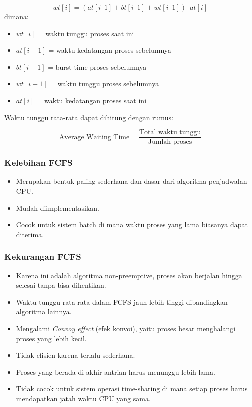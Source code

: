 \documentclass[12pt]{article}
\begin{document}
	\[
	wt[i] = (at[i–1] + bt[i–1] + wt[i–1]) – at[i]
	\]
	dimana:
	\begin{itemize}
		\item $wt[i]$ = waktu tunggu proses saat ini
		\item $at[i-1]$ = waktu kedatangan proses sebelumnya
		\item $bt[i-1]$ = burst time proses sebelumnya
		\item $wt[i-1]$ = waktu tunggu proses sebelumnya
		\item $at[i]$ = waktu kedatangan proses saat ini
	\end{itemize}
	
	Waktu tunggu rata-rata dapat dihitung dengan rumus:
	
	\[
	\text{Average Waiting Time} = \frac{\text{Total waktu tunggu}}{\text{Jumlah proses}}
	\]
	
	\subsubsection*{Kelebihan FCFS}
	\begin{itemize}
		\item Merupakan bentuk paling sederhana dan dasar dari algoritma penjadwalan CPU.
		\item Mudah diimplementasikan.
		\item Cocok untuk sistem batch di mana waktu proses yang lama biasanya dapat diterima.
	\end{itemize}
	
	\subsubsection*{Kekurangan FCFS}
	\begin{itemize}
		\item Karena ini adalah algoritma non-preemptive, proses akan berjalan hingga selesai tanpa bisa dihentikan.
		\item Waktu tunggu rata-rata dalam FCFS jauh lebih tinggi dibandingkan algoritma lainnya.
		\item Mengalami \textit{Convoy effect} (efek konvoi), yaitu proses besar menghalangi proses yang lebih kecil.
		\item Tidak efisien karena terlalu sederhana.		
		\item Proses yang berada di akhir antrian harus menunggu lebih lama.		
		\item Tidak cocok untuk sistem operasi time-sharing di mana setiap proses harus mendapatkan jatah waktu CPU yang sama.	
	\end{itemize}
	
\end{document}
